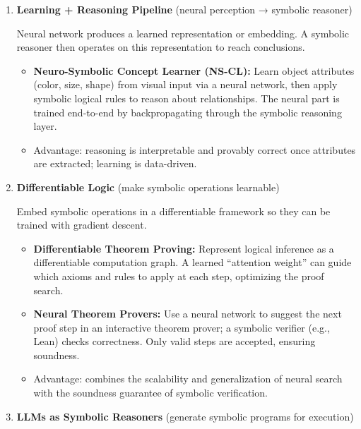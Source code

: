 \begin{enumerate}
    \item \textbf{Learning + Reasoning Pipeline} (neural perception → symbolic reasoner)

    Neural network produces a learned representation or embedding. A symbolic reasoner then operates on this representation to reach conclusions.
    \begin{itemize}
        \item \textbf{Neuro-Symbolic Concept Learner (NS-CL):} Learn object attributes (color, size, shape) from visual input via a neural network, then apply symbolic logical rules to reason about relationships. The neural part is trained end-to-end by backpropagating through the symbolic reasoning layer.
        \item Advantage: reasoning is interpretable and provably correct once attributes are extracted; learning is data-driven.
    \end{itemize}

    \item \textbf{Differentiable Logic} (make symbolic operations learnable)

    Embed symbolic operations in a differentiable framework so they can be trained with gradient descent.
    \begin{itemize}
        \item \textbf{Differentiable Theorem Proving:} Represent logical inference as a differentiable computation graph. A learned ``attention weight'' can guide which axioms and rules to apply at each step, optimizing the proof search.
        \item \textbf{Neural Theorem Provers:} Use a neural network to suggest the next proof step in an interactive theorem prover; a symbolic verifier (e.g., Lean) checks correctness. Only valid steps are accepted, ensuring soundness.
        \item Advantage: combines the scalability and generalization of neural search with the soundness guarantee of symbolic verification.
    \end{itemize}

    \item \textbf{LLMs as Symbolic Reasoners} (generate symbolic programs for execution)


\end{enumerate}
